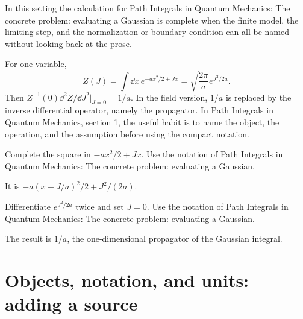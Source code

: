 In this setting the calculation for Path Integrals in Quantum Mechanics: The concrete problem: evaluating a Gaussian is complete when the finite model, the limiting step, and the normalization or boundary condition can all be named without looking back at the prose.




\begin{example}
For one variable,
\[
  Z(J)=\int\dd x\,e^{-ax^2/2+Jx}
  =\sqrt{\frac{2\pi}{a}}e^{J^2/2a}.
\]
Then \(Z^{-1}(0)\dd^2Z/\dd J^2|_{J=0}=1/a\).  In the field version, \(1/a\) is replaced by the inverse differential operator, namely the propagator.  In Path Integrals in Quantum Mechanics, section 1, the useful habit is to name the object, the operation, and the assumption before using the compact notation.
\end{example}



\begin{exercise}
Complete the square in \(-ax^2/2+Jx\).  Use the notation of Path Integrals in Quantum Mechanics: The concrete problem: evaluating a Gaussian.
\begin{answer}
It is \(-a(x-J/a)^2/2+J^2/(2a)\).
\end{answer}
\end{exercise}

\begin{exercise}
Differentiate \(e^{J^2/2a}\) twice and set \(J=0\).  Use the notation of Path Integrals in Quantum Mechanics: The concrete problem: evaluating a Gaussian.
\begin{answer}
The result is \(1/a\), the one-dimensional propagator of the Gaussian integral.
\end{answer}
\end{exercise}



\section{Objects, notation, and units: adding a source}













